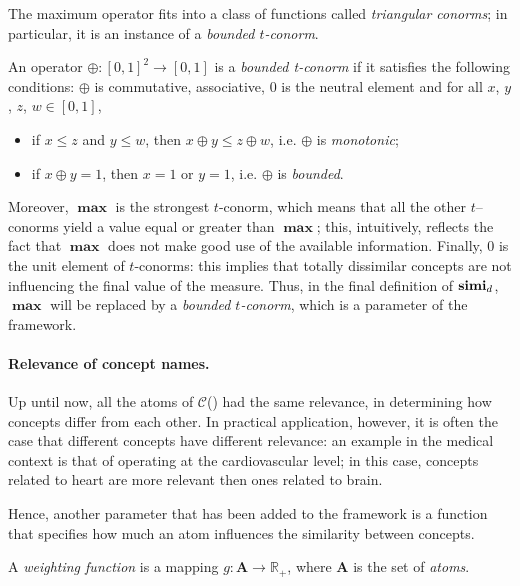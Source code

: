   The maximum operator fits into a class of functions called \emph{triangular conorms}; %
  in particular, it is an instance of a \emph{bounded \(t\)-conorm}.
  \begin{definition}%
    An operator \(\oplus \colon {[0,1]}^2 \to [0,1]\) is a \emph{bounded t-conorm} if it satisfies the following conditions: \(\oplus\) is commutative, associative, \(0\) is the neutral element and for all \(x\), \(y\), \(z\), \(w \in [0,1]\),
    \begin{itemize}
      \item if \(x \le z\) and \(y \le w\), then \(x \oplus y \le z \oplus w\), i.e. \(\oplus{}\) is \emph{monotonic};
      \item if \(x \oplus y = 1\), then \(x = 1\) or \(y = 1\), i.e. \(\oplus{}\) is \emph{bounded}.
    \end{itemize}
  \end{definition}
  Moreover, \(\mathbf{\max}\) is the strongest \(t\)-conorm, which means that all the other \(t\)--conorms yield a value equal or greater than \(\mathbf{\max}\); this, intuitively, reflects the fact that \(\mathbf{\max}\) does not make good use of the available information.
  Finally, \(0\) is the unit element of \(t\)-conorms: this implies that totally dissimilar concepts are not influencing the final value of the measure.
  Thus, in the final definition of \(\mathbf{simi}_d\), \(\mathbf{\max}\) will be replaced by a \emph{bounded \(t\)-conorm}, which is a parameter of the framework.

  \paragraph{Relevance of concept names.}
  Up until now, all the atoms of \(\mathcal{C}\)(\elh) had the same relevance, in determining how concepts differ from each other.
  In practical application, however, it is often the case that different concepts have different relevance: an example in the medical context is that of operating at the cardiovascular level; in this case, concepts related to heart are more relevant then ones related to brain.

  Hence, another parameter that has been added to the framework is a function that specifies how much an atom influences the similarity between concepts.
  \begin{definition}%
    A \emph{weighting function} is a mapping \(g \colon \mathbf{A} \to \mathbb{R}_+\), where \(\mathbf{A}\) is the set of \emph{atoms}.
  \end{definition}

